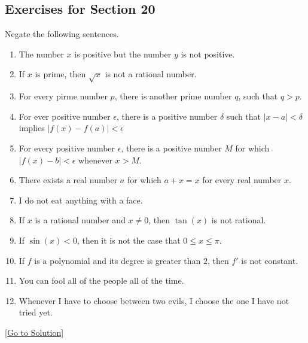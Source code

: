 \subsection{Exercises for Section 20}
\begin{exercise}\label{ex:2.20.1}
    Negate the following sentences. 
    \begin{enumerate}
        \item The number $x$ is positive but the number $y$ is not positive. 
        \item If $x$ is prime, then $\sqrt{x}$ is not a rational number. 
        \item For every pirme number $p$, there is another prime number $q$, such that $q>p$. 
        \item For ever positive number $\epsilon$, there is a positive number $\delta$ such that $\lvert x-a \rvert<\delta$ implies $\lvert f(x)-f(a) \rvert<\epsilon$
        \item For every positive number $\epsilon$, there is a positive number $M$ for which $\lvert f(x)-b \rvert<\epsilon$ whenever $x>M$. 
        \item There exists a real number $a$ for which $a+x=x$ for every real number $x$.
        \item I do not eat anything with a face. 
        \item If $x$ is a rational number and $x\ne 0$, then $\tan(x)$ is not rational. 
        \item If $\sin(x)<0$, then it is not the case that $0 \le x \le \pi$.
        \item If $f$ is a polynomial and its degree is greater than $2$, then $f'$ is not constant. 
        \item You can fool all of the people all of the time. 
        \item Whenever I have to choose between two evils, I choose the one I have not tried yet. 
    \end{enumerate}
\end{exercise}\hyperref[sol:2.20.1]{[Go to Solution]}


